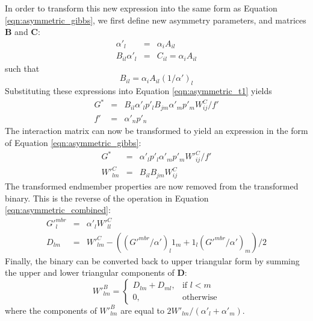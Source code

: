 \documentclass[preprint,12pt]{elsarticle}
\begin{document}
In order to transform this new expression into the same form as Equation \ref{eqn:asymmetric_gibbs}, we first define new asymmetry parameters, and matrices $\boldsymbol{B}$ and $\boldsymbol{C}$:
\begin{eqnarray}
    \alpha'_l &=& \alpha_i A_{il}\\
    B_{il} \alpha'_l &=& C_{il} = \alpha_i A_{il}
\end{eqnarray} 
such that
\begin{equation}
    B_{il} = \alpha_i A_{il} (1/\alpha')_l
\end{equation}
Substituting these expressions into Equation \ref{eqn:asymmetric_t1} yields
\begin{eqnarray}
    G^* &=& B_{il} \alpha'_l p'_l B_{jm} \alpha'_m p'_m W_{ij}^C/f' \\
    f' &=& \alpha'_n p'_n 
    \label{eqn:asymmetric_t2}
\end{eqnarray}
The interaction matrix can now be transformed to yield an expression in the form of Equation \ref{eqn:asymmetric_gibbs}:
\begin{eqnarray}
    G^* &=& \alpha'_l p'_l \alpha'_m p'_m W'^C_{ij}/{f'}\\
    W'^C_{lm} &=& B_{il} B_{jm} W^C_{ij} 
\end{eqnarray}
The transformed endmember properties are now removed from the transformed binary. This is the reverse of the operation in Equation \ref{eqn:asymmetric_combined}:
\begin{eqnarray}
    G'^{mbr}_l &=& \alpha'_l W'^{C}_{ll} \\
    D_{lm} &=& W'^{C}_{lm} - \left((G'^{mbr}/\alpha')_l 1_m + 1_l (G'^{mbr}/\alpha')_m\right)/2
\end{eqnarray}
Finally, the binary can be converted back to upper triangular form by summing the upper and lower triangular components of $\boldsymbol{D}$:
\begin{equation}
    W'^B_{lm} = 
    \begin{cases}
        D_{lm} + D_{ml},& \text{if } l<m\\
        0,              & \text{otherwise}
    \end{cases}
\end{equation}
where the components of $W'^B_{lm}$ are equal to $2 W'_{lm} / (\alpha'_l + \alpha'_m)$.
\end{document}
